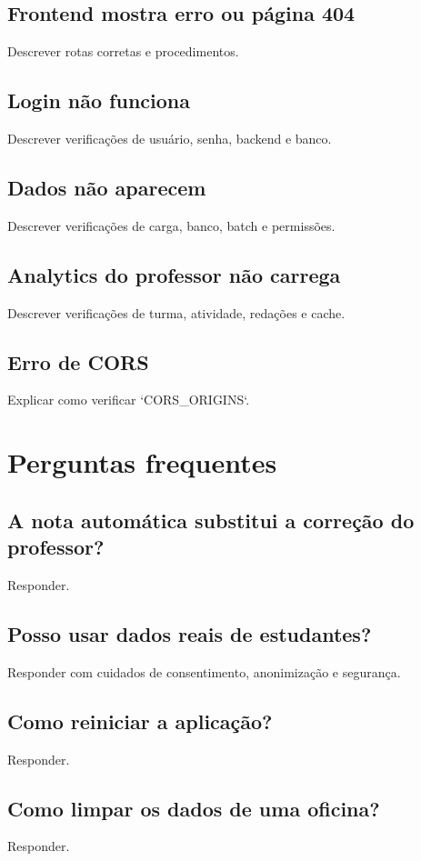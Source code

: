 \documentclass[12pt,a4paper]{article}
\begin{document}
\subsection{Frontend mostra erro ou página 404}
Descrever rotas corretas e procedimentos.

\subsection{Login não funciona}
Descrever verificações de usuário, senha, backend e banco.

\subsection{Dados não aparecem}
Descrever verificações de carga, banco, batch e permissões.

\subsection{Analytics do professor não carrega}
Descrever verificações de turma, atividade, redações e cache.

\subsection{Erro de CORS}
Explicar como verificar `CORS_ORIGINS`.

\section{Perguntas frequentes}

\subsection{A nota automática substitui a correção do professor?}
Responder.

\subsection{Posso usar dados reais de estudantes?}
Responder com cuidados de consentimento, anonimização e segurança.

\subsection{Como reiniciar a aplicação?}
Responder.

\subsection{Como limpar os dados de uma oficina?}
Responder.
\end{document}
